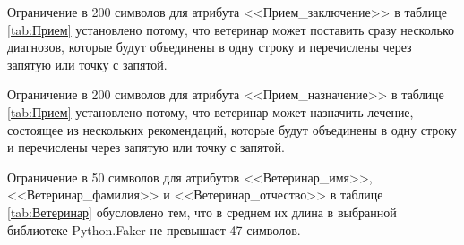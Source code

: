 \documentclass[a4paper]{article}
\begin{document}
Ограничение в 200 символов для атрибута <<Прием\_заключение>> в таблице \ref{tab:Прием} установлено потому, что ветеринар может поставить сразу несколько диагнозов, которые будут объединены в одну строку и перечислены через запятую или точку с запятой.

Ограничение в 200 символов для атрибута <<Прием\_назначение>> в таблице \ref{tab:Прием} установлено потому, что ветеринар может назначить лечение, состоящее из нескольких рекомендаций, которые будут объединены в одну строку и перечислены через запятую или точку с запятой.

\begin{table}[H]
  \caption{Прием - appointment}
  \label{tab:Прием}
\end{table}

Ограничение в 50 символов для атрибутов <<Ветеринар\_имя>>, <<Ветеринар\_фамилия>> и <<Ветеринар\_отчество>> в таблице \ref{tab:Ветеринар} обусловлено тем, что в среднем их длина в выбранной библиотеке Python.Faker не превышает 47 символов. 
\end{document}
